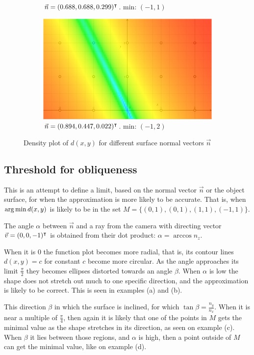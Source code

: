 \begin{figure}[h]
\begin{subfigure}{.49\textwidth}
	\caption{$\vec{n} = (0.688, 0.688, 0.299)^\intercal$. min: $(-1, 1)$}
\end{subfigure}%
\begin{subfigure}{.49\textwidth}
	\includegraphics[width=\linewidth]{fig/lmin/80-40-2.pdf}
	\caption{$\vec{n} = (0.894, 0.447, 0.022)^\intercal$. min: $(-1, 2)$}
\end{subfigure}
\caption{Density plot of $d(x, y)$ for different surface normal vectors $\vec{n}$}
\label{fig:lmin_d_func}
\end{figure}


\subsection{Threshold for obliqueness}
This is an attempt to define a limit, based on the normal vector $\vec{n}$ or the object surface, for when the approximation is more likely to be accurate. That is, when $\operatorname*{arg\,min} d(x, y)$ is likely to be in the set $M = \{ (0, 1), (0, 1), (1, 1), (-1, 1) \}$.

The angle $\alpha$ between $\vec{n}$ and a ray from the camera with directing vector $\vec{v} = (0, 0, -1)^\intercal$ is obtained from their dot product: $\alpha = \arccos n_z$. 

When it is $0$ the function plot becomes more radial, that is, its contour lines $d(x,y)=c$ for constant $c$ become more circular. As the angle approaches its limit $\frac{\pi}{2}$ they becomes ellipses distorted towards an angle $\beta$. When $\alpha$ is low the shape does not stretch out much to one specific direction, and the approximation is likely to be correct. This is seen in examples (a) and (b).

This direction $\beta$ in which the surface is inclined, for which $\tan \beta = \frac{n_y}{n_x}$. When it is near a multiple of $\frac{\pi}{4}$, then again it is likely that one of the points in $M$ gets the minimal value as the shape stretches in its direction, as seen on example (c). When $\beta$ it lies between those regions, and $\alpha$ is high, then a point outside of $M$ can get the minimal value, like on example (d).

